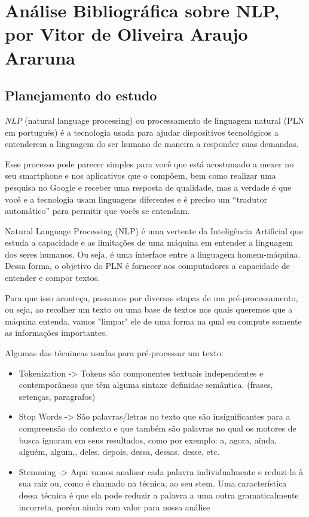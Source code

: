 \chapter{Análise Bibliográfica sobre NLP, por Vitor de Oliveira Araujo Araruna\label{chap:bibliometria:vitorararuna}}

\section{Planejamento do estudo}

\textit{NLP} (natural language processing) ou processamento de linguagem natural (PLN em português) é a tecnologia usada para ajudar dispositivos tecnológicos a entenderem a linguagem do ser humano de maneira a responder suas demandas.

Esse processo pode parecer simples para você que está acostumado a mexer no seu smartphone e nos aplicativos que o compõem, bem como realizar uma pesquisa no Google e receber uma resposta de qualidade, mas a verdade é que você e a tecnologia usam linguagens diferentes e é preciso um “tradutor automático” para permitir que vocês se entendam.

 Natural Language Processing (NLP) é uma vertente da Inteligência Artificial que estuda a capacidade e as limitações de uma máquina em entender a linguagem dos seres humanos. Ou seja, é uma interface entre a linguagem homem-máquina. Dessa forma, o objetivo do PLN é fornecer aos computadores a capacidade de entender e compor textos.
 
 Para que isso aconteça, passamos por diversas etapas de um pré-processamento, ou seja, ao recolher um texto ou uma base de textos nos quais queremos que a máquina entenda, vamos "limpar" ele de uma forma na qual eu compute somente as informações importantes.
 
Algumas das técnincas usadas para pré-processar um texto:
\begin{itemize}
    \item Tokenization -> Tokens são componentes textuais independentes e contemporâneos que têm alguma sintaxe definidae semântica. (frases, setenças, paragrafos) 
    \item Stop Words -> São palavras/letras no texto que são insignificantes para a compreensão do contexto e que também são palavras no qual os motores de busca ignoram em seus resultados, como por exemplo: a, agora, ainda, alguém, algum,, deles, depois, dessa, dessas, desse, etc.
    \item Stemming -> Aqui vamos analisar cada palavra individualmente e reduzi-la à sua raiz ou, como é chamado na técnica, ao seu stem. Uma característica dessa técnica é que ela pode reduzir a palavra a uma outra gramaticalmente incorreta, porém ainda com valor para nossa análise
\end{itemize}


